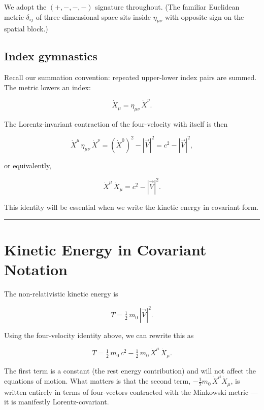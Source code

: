We adopt the $(+,-,-,-)$ signature throughout. (The familiar Euclidean metric $\delta_{ij}$ of three-dimensional space sits inside $\eta_{\mu\nu}$ with opposite sign on the spatial block.)

\subsection*{Index gymnastics}

Recall our summation convention: repeated upper-lower index pairs are summed. The metric lowers an index:

\begin{equation}
\dot{X}_\mu = \eta_{\mu\nu}\,\dot{X}^\nu.
\end{equation}

The Lorentz-invariant contraction of the four-velocity with itself is then

\begin{equation}
\dot{X}^\mu\,\eta_{\mu\nu}\,\dot{X}^\nu = (\dot{X}^0)^2 - |\vec{V}|^2 = c^2 - |\vec{V}|^2,
\end{equation}

or equivalently,

\begin{equation}
\dot{X}^\mu\,\dot{X}_\mu = c^2 - |\vec{V}|^2.
\end{equation}

This identity will be essential when we write the kinetic energy in covariant form.

\hrule
\vspace{1em}

\section{Kinetic Energy in Covariant Notation}

The non-relativistic kinetic energy is

\begin{equation}
T = \tfrac{1}{2}\,m_0\,|\vec{V}|^2.
\end{equation}

Using the four-velocity identity above, we can rewrite this as

\begin{equation}
T = \tfrac{1}{2}\,m_0\,c^2 - \tfrac{1}{2}\,m_0\,\dot{X}^\mu\,\dot{X}_\mu.
\end{equation}

The first term is a constant (the rest energy contribution) and will not affect the equations of motion. What matters is that the second term, $-\frac{1}{2}m_0\,\dot{X}^\mu\dot{X}_\mu$, is written entirely in terms of four-vectors contracted with the Minkowski metric --- it is manifestly Lorentz-covariant.


